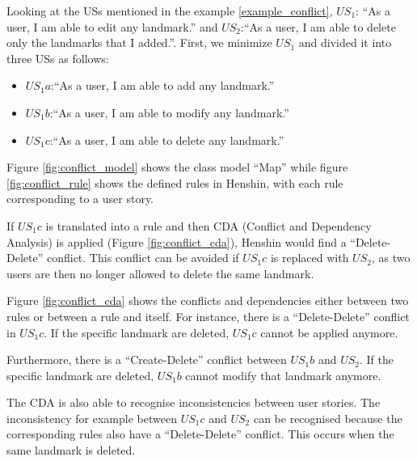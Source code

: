 \begin{example}
Looking at the USs mentioned in the example \ref{example_conflict}, $US_1$: \enquote{As a user, I am able to edit any landmark.} and $US_2$:\enquote{As a user, I am able to delete only the landmarks that I added.}. First, we minimize $US_1$ and divided it into three USs as follows:
\begin{itemize}
\item $US_1a$:\enquote{As a user, I am able to add any landmark.}
\item $US_1b$:\enquote{As a user, I am able to modify any landmark.}
\item $US_1c$:\enquote{As a user, I am able to delete any landmark.}
\end{itemize}
Figure \ref{fig:conflict_model} shows the class model \enquote{Map} while figure \ref{fig:conflict_rule} shows the defined rules in Henshin, with each rule corresponding to a user story.

If $US_1c$ is translated into a rule and then CDA (Conflict and Dependency Analysis) is applied (Figure \ref{fig:conflict_cda}), Henshin would find a \enquote{Delete-Delete} conflict. This conflict can be avoided if $US_1c$ is replaced with $US_2$, as two users are then no longer allowed to delete the same landmark.

Figure \ref{fig:conflict_cda} shows the conflicts and dependencies either between two rules or between a rule and itself. For instance, there is a \enquote{Delete-Delete} conflict in $US_1c$. If the specific landmark are deleted, $US_1c$ cannot be applied anymore. 

Furthermore, there is a \enquote{Create-Delete} conflict between $US_1b$ and $US_2$. If the specific landmark are deleted, $US_1b$ cannot modify that landmark anymore.

The CDA is also able to recognise inconsistencies between user stories. The inconsistency for example between $US_1c$ and $US_2$ can be recognised because the corresponding rules also have a \enquote{Delete-Delete} conflict. This occurs when the same landmark is deleted. %


\end{example}

